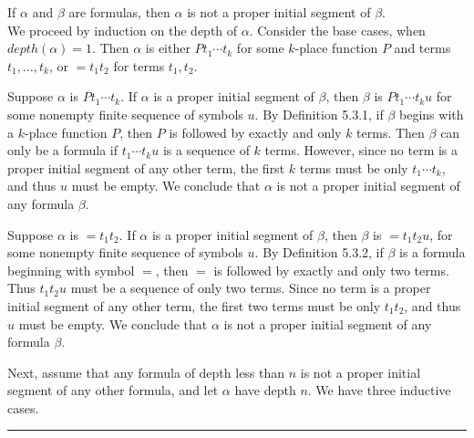 \documentclass[11pt]{hmcpset}
\newenvironment{problem2}[1]{\noindent {\bf (#1}}
{\medskip}
\newenvironment{proof}{\noindent {\bf Proof:} \\}{\hfill
\rule{1mm}{3mm} \bigskip}
\begin{document}
\begin{problem2}{d)}
If $\alpha$ and $\beta$ are formulas, then $\alpha$ is not a proper initial segment of $\beta$.
\end{problem2}
\begin{proof}\indent We proceed by induction on the depth of $\alpha$. Consider the base cases, when $depth(\alpha) =1$. Then $\alpha$ is either $Pt_1\cdots t_k$ for some $k$-place function $P$ and terms $t_1,\ldots, t_k$, or $=t_1t_2$ for terms $t_1, t_2$.

\indent Suppose $\alpha$ is $Pt_1\cdots t_k$. If $\alpha$ is a proper initial segment of $\beta$, then $\beta$ is $Pt_1\cdots t_ku$ for some nonempty finite sequence of symbols $u$. By Definition 5.3.1, if $\beta$ begins with a $k$-place function $P$, then $P$ is followed by exactly and only $k$ terms. Then $\beta$ can only be a formula if $t_1\cdots t_ku$ is a sequence of $k$ terms. However, since no term is a proper initial segment of any other term, the first $k$ terms must be only $t_1\cdots t_k$, and thus $u$ must be empty. We conclude that $\alpha$ is not a proper initial segment of any formula $\beta$.

Suppose $\alpha$ is $=t_1t_2$. If $\alpha$ is a proper initial segment of $\beta$, then $\beta$ is $=t_1t_2u$, for some nonempty finite sequence of symbols $u$. By Definition 5.3.2, if $\beta$ is a formula beginning with symbol $=$, then $=$ is followed by exactly and only two terms. Thus $t_1t_2u$ must be a sequence of only two terms. Since no term is a proper initial segment of any other term, the first two terms must be only $t_1t_2$, and thus $u$ must be empty. We conclude that $\alpha$ is not a proper initial segment of any formula $\beta$.

Next, assume that any formula of depth less than $n$ is not a proper initial segment of any other formula, and let $\alpha$ have depth $n$. We have three inductive cases.


\end{proof}
\end{document}
